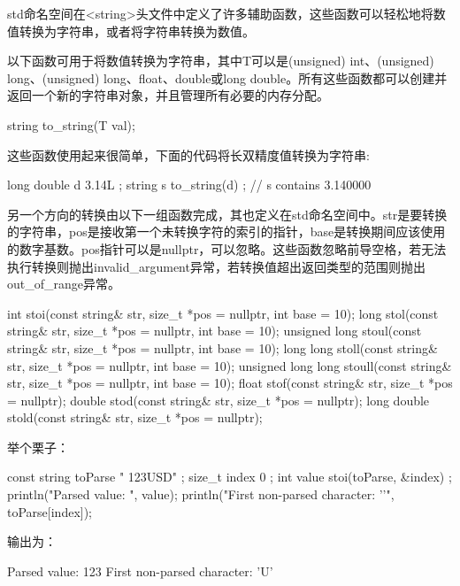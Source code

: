 std命名空间在<string>头文件中定义了许多辅助函数，这些函数可以轻松地将数值转换为字符串，或者将字符串转换为数值。


以下函数可用于将数值转换为字符串，其中T可以是(unsigned) int、(unsigned) long、(unsigned) long、float、double或long double。所有这些函数都可以创建并返回一个新的字符串对象，并且管理所有必要的内存分配。

\begin{cpp}
string to_string(T val);
\end{cpp}

这些函数使用起来很简单，下面的代码将长双精度值转换为字符串:

\begin{cpp}
long double d { 3.14L };
string s { to_string(d) }; // s contains 3.140000
\end{cpp}


另一个方向的转换由以下一组函数完成，其也定义在std命名空间中。str是要转换的字符串，pos是接收第一个未转换字符的索引的指针，base是转换期间应该使用的数字基数。pos指针可以是nullptr，可以忽略。这些函数忽略前导空格，若无法执行转换则抛出invalid\_argument异常，若转换值超出返回类型的范围则抛出out\_of\_range异常。

\begin{cpp}
int stoi(const string& str, size_t *pos = nullptr, int base = 10);
long stol(const string& str, size_t *pos = nullptr, int base = 10);
unsigned long stoul(const string& str, size_t *pos = nullptr, int base = 10);
long long stoll(const string& str, size_t *pos = nullptr, int base = 10);
unsigned long long stoull(const string& str, size_t *pos = nullptr, int base = 10);
float stof(const string& str, size_t *pos = nullptr);
double stod(const string& str, size_t *pos = nullptr);
long double stold(const string& str, size_t *pos = nullptr);
\end{cpp}

举个栗子：

\begin{cpp}
const string toParse { " 123USD" };
size_t index { 0 };
int value { stoi(toParse, &index) };
println("Parsed value: {}", value);
println("First non-parsed character: '{}'", toParse[index]);
\end{cpp}

输出为：

\begin{shell}
Parsed value: 123
First non-parsed character: 'U'
\end{shell}

